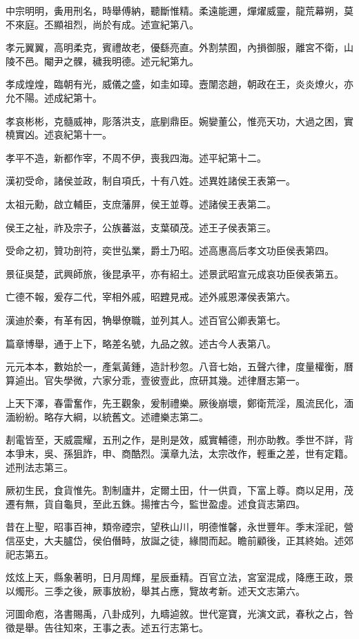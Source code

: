\begin{pinyinscope}
中宗明明，夤用刑名，時舉傅納，聽斷惟精。柔遠能邇，燀燿威靈，龍荒幕朔，莫不來庭。丕顯祖烈，尚於有成。述宣紀第八。

孝元翼翼，高明柔克，賓禮故老，優繇亮直。外割禁囿，內損御服，離宮不衛，山陵不邑。閹尹之髁，穢我明德。述元紀第九。

孝成煌煌，臨朝有光，威儀之盛，如圭如璋。壼闈恣趙，朝政在王，炎炎燎火，亦允不陽。述成紀第十。

孝哀彬彬，克髓威神，彫落洪支，底剭鼎臣。婉孌董公，惟亮天功，大過之困，實橈實凶。述哀紀第十一。

孝平不造，新都作宰，不周不伊，喪我四海。述平紀第十二。

漢初受命，諸侯並政，制自項氏，十有八姓。述異姓諸侯王表第一。

太祖元勳，啟立輔臣，支庶藩屏，侯王並尊。述諸侯王表第二。

侯王之祉，祚及宗子，公族蕃滋，支葉碩茂。述王子侯表第三。

受命之初，贊功剖符，奕世弘業，爵土乃昭。述高惠高后孝文功臣侯表第四。

景征吳楚，武興師旅，後昆承平，亦有紹土。述景武昭宣元成哀功臣侯表第五。

亡德不報，爰存二代，宰相外戚，昭韙見戒。述外戚恩澤侯表第六。

漢迪於秦，有革有因，觕舉僚職，並列其人。述百官公卿表第七。

篇章博舉，通于上下，略差名號，九品之敘。述古今人表第八。

元元本本，數始於一，產氣黃鍾，造計秒忽。八音七始，五聲六律，度量權衡，曆算逌出。官失學微，六家分乖，壹彼壹此，庶研其幾。述律曆志第一。

上天下澤，春雷奮作，先王觀象，爰制禮樂。厥後崩壞，鄭衛荒淫，風流民化，湎湎紛紛。略存大綱，以統舊文。述禮樂志第二。

剨電皆至，天威震耀，五刑之作，是則是效，威實輔德，刑亦助教。季世不詳，背本爭末，吳、孫狙詐，申、商酷烈。漢章九法，太宗改作，輕重之差，世有定籍。述刑法志第三。

厥初生民，食貨惟先。割制廬井，定爾土田，什一供貢，下富上尊。商以足用，茂遷有無，貨自龜貝，至此五銖。揚搉古今，監世盈虛。述食貨志第四。

昔在上聖，昭事百神，類帝禋宗，望秩山川，明德惟馨，永世豐年。季末淫祀，營信巫史，大夫臚岱，侯伯僭畤，放誕之徒，緣間而起。瞻前顧後，正其終始。述郊祀志第五。

炫炫上天，縣象著明，日月周輝，星辰垂精。百官立法，宮室混成，降應王政，景以燭形。三季之後，厥事放紛，舉其占應，覽故考新。述天文志第六。

河圖命庖，洛書賜禹，八卦成列，九疇逌敘。世代寔寶，光演文武，春秋之占，咎徵是舉。告往知來，王事之表。述五行志第七。


\end{pinyinscope}
